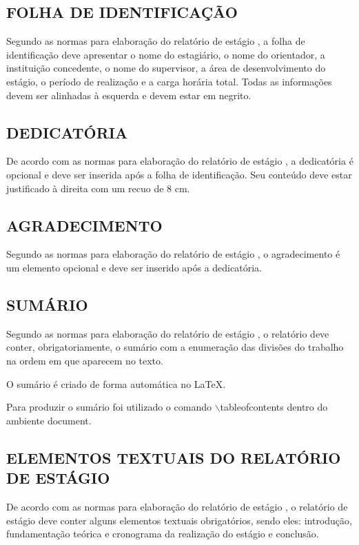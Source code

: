\subsection{FOLHA DE IDENTIFICAÇÃO}
Segundo as normas para elaboração do relatório de estágio \cite{manualEstagio}, a folha de identificação deve apresentar o nome do estagiário, o nome do orientador, a instituição concedente, o nome do supervisor, a área de desenvolvimento do estágio, o período de realização e a carga horária total. Todas as informações devem ser alinhadas à esquerda e devem estar em negrito.

\subsection{DEDICATÓRIA}
De acordo com as normas para elaboração do relatório de estágio \cite{manualEstagio}, a dedicatória é opcional e deve ser inserida após a folha de identificação. Seu conteúdo deve estar justificado à direita com um recuo de 8 cm.

\subsection{AGRADECIMENTO}
Segundo as normas para elaboração do relatório de estágio \cite{manualEstagio}, o agradecimento é um elemento opcional e deve ser inserido após a dedicatória.

\subsection{SUMÁRIO}
Segundo as normas para elaboração do relatório de estágio \cite{manualEstagio}, o relatório deve conter, obrigatoriamente, o sumário com a enumeração das divisões do trabalho na ordem em que aparecem no texto.

O sumário é criado de forma automática no LaTeX.

Para produzir o sumário foi utilizado o comando $\backslash$tableofcontents dentro do ambiente document.

\subsection{ELEMENTOS TEXTUAIS DO RELATÓRIO DE ESTÁGIO}
De acordo com as normas para elaboração do relatório de estágio \cite{manualEstagio}, o relatório de estágio deve conter alguns elementos textuais obrigatórios, sendo eles: introdução, fundamentação teórica e cronograma da realização do estágio e conclusão.

